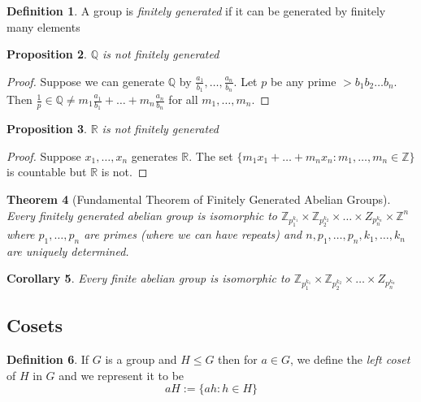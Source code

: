 \documentclass{article}
\newcommand{\R}{\mathbb{R}}
\newcommand{\Z}{\mathbb{Z}}
\newtheorem{theorem}{Theorem}[section]
\newtheorem{corollary}[theorem]{Corollary}
\newtheorem{proposition}[theorem]{Proposition}
\theoremstyle{definition}
\newtheorem{definition}[theorem]{Definition}
\begin{document}
\begin{definition}
    A group is \emph{finitely generated} if it can be generated by finitely many elements
\end{definition}
\begin{proposition}
    $\mathbb{Q}$ is not finitely generated
\end{proposition}
\begin{proof}
    Suppose we can generate $\mathbb{Q}$ by $\frac{a_1}{b_1},\ldots, \frac{a_n}{b_n}$. Let $p$ be any prime $> b_1b_2\ldots b_n$. Then $\frac{1}{p} \in \mathbb{Q} \neq m_1 \frac{a_1}{b_1}+\ldots +m_n \frac{a_n}{b_n}$ for all $m_1,\ldots, m_n$.
\end{proof}
\begin{proposition}
    $\R$ is not finitely generated
\end{proposition}
\begin{proof}
    Suppose $x_1,\ldots,x_n$ generates $\R$. The set $\{m_1x_1+\ldots+m_nx_n: m_1,\ldots,m_n \in \Z\}$ is countable but $\R$ is not.
\end{proof}
\begin{theorem}[Fundamental Theorem of Finitely Generated Abelian Groups]
    Every finitely generated abelian group is isomorphic to $\Z_{p_1^{k_1}} \times\Z_{p_2^{k_2}} \times \ldots \times Z_{p_n^{k_n}} \times \Z^n$ where $p_1,\ldots,p_n$ are primes (where we can have repeats) and $n,p_1,\ldots, p_n, k_1,\ldots,k_n$ are uniquely determined.
\end{theorem}
\begin{corollary}
    Every finite abelian group is isomorphic to $\Z_{p_1^{k_1}} \times\Z_{p_2^{k_2}} \times \ldots \times Z_{p_n^{k_n}}$
\end{corollary}
\subsection{Cosets}
\begin{definition}
    If $G$ is a group and $H\leq G$ then for $a\in G$, we define the \emph{left coset} of $H$ in $G$ and we represent it to be 
    \begin{equation*}
        aH := \{ah : h \in H\}
    \end{equation*}
\end{definition}
\end{document}
